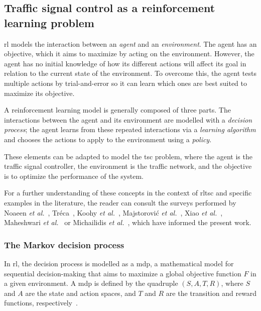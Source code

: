 \subsection{Traffic signal control as a reinforcement learning problem}\label{subsec:TSC_as_a_RL_problem}
\Acrlong{rl} models the interaction between an \textit{agent} and an \textit{environment}. The agent has an objective, which it aims to maximize by acting on the environment. However, the agent has no initial knowledge of how its different actions will affect its goal in relation to the current state of the environment. To overcome this, the agent tests multiple actions by trial-and-error so it can learn which ones are best suited to maximize its objective.

A reinforcement learning model is generally composed of three parts. The interactions between the agent and its environment are modelled with a \textit{decision process}; the agent learns from these repeated interactions via a \textit{learning algorithm} and chooses the actions to apply to the environment using a \textit{policy}.

These elements can be adapted to model the \gls{tsc} problem, where the agent is the traffic signal controller, the environment is the traffic network, and the objective is to optimize the performance of the system.

For a further understanding of these concepts in the context of \gls{rltsc} and specific examples in the literature, the reader can consult the surveys performed by Noaeen \textit{et al.}~\cite{Noaeen2022}, Tréca~\cite{Treca2022}, Koohy \textit{et al.}~\cite{Koohy2022}, Majstorović \textit{et al.}~\cite{Majstorović2023}, Xiao \textit{et al.}~\cite{Xiao2024}, Maheshwari \textit{et al.}~\cite{Maheshwari2025} or Michailidis \textit{et al.}~\cite{Michailidis2025}, which have informed the present work. \label{par:reviews a consultar}

\subsubsection{The Markov decision process} \label{subsubsec:mdp}
In \gls{rl}, the decision process is modelled as a \gls{mdp}, a mathematical model for sequential decision-making that aims to maximize a global objective function $F$ in a given environment. A \gls{mdp} is defined by the quadruple $(S,A,T,R)$, where $S$ and $A$ are the state and action spaces, and $T$ and $R$ are the transition and reward functions, respectively~\cite{Bellman1957}.

